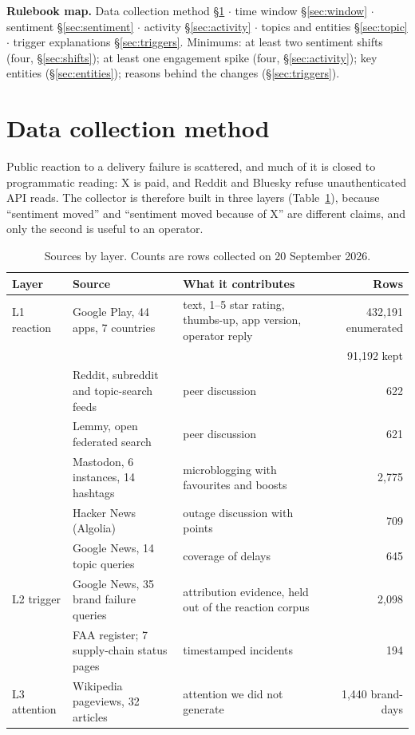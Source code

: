 \documentclass[11pt,a4paper]{article}
\begin{document}
\smallskip
{\small\textbf{Rulebook map.} Data collection method \S\ref{sec:collection} $\cdot$ time window \S\ref{sec:window} $\cdot$ sentiment \S\ref{sec:sentiment} $\cdot$ activity \S\ref{sec:activity} $\cdot$ topics and entities \S\ref{sec:topic} $\cdot$ trigger explanations \S\ref{sec:triggers}. Minimums: at least two sentiment shifts (four, \S\ref{sec:shifts}); at least one engagement spike (four, \S\ref{sec:activity}); key entities (\S\ref{sec:entities}); reasons behind the changes (\S\ref{sec:triggers}).}

\section{Data collection method}\label{sec:collection}

Public reaction to a delivery failure is scattered, and much of it is closed to programmatic reading: X is paid, and Reddit and Bluesky refuse unauthenticated API reads. The collector is therefore built in three layers (Table~\ref{tab:sources}), because ``sentiment moved'' and ``sentiment moved because of X'' are different claims, and only the second is useful to an operator.

\begin{table}[htbp]\centering\small
\caption{Sources by layer. Counts are rows collected on 20 September 2026.}\label{tab:sources}
\begin{tabularx}{\linewidth}{@{}l l X r@{}}
\toprule
Layer & Source & What it contributes & Rows\\
\midrule
L1 reaction & Google Play, 44 apps, 7 countries & text, 1--5 star rating, thumbs-up, app version, operator reply & 432,191 enumerated\\
 & & & 91,192 kept\\
 & Reddit, subreddit and topic-search feeds & peer discussion & 622\\
 & Lemmy, open federated search & peer discussion & 621\\
 & Mastodon, 6 instances, 14 hashtags & microblogging with favourites and boosts & 2,775\\
 & Hacker News (Algolia) & outage discussion with points & 709\\
 & Google News, 14 topic queries & coverage of delays & 645\\
L2 trigger & Google News, 35 brand failure queries & attribution evidence, held out of the reaction corpus & 2,098\\
 & FAA register; 7 supply-chain status pages & timestamped incidents & 194\\
L3 attention & Wikipedia pageviews, 32 articles & attention we did not generate & 1,440 brand-days\\
\bottomrule
\end{tabularx}
\end{table}
\end{document}
